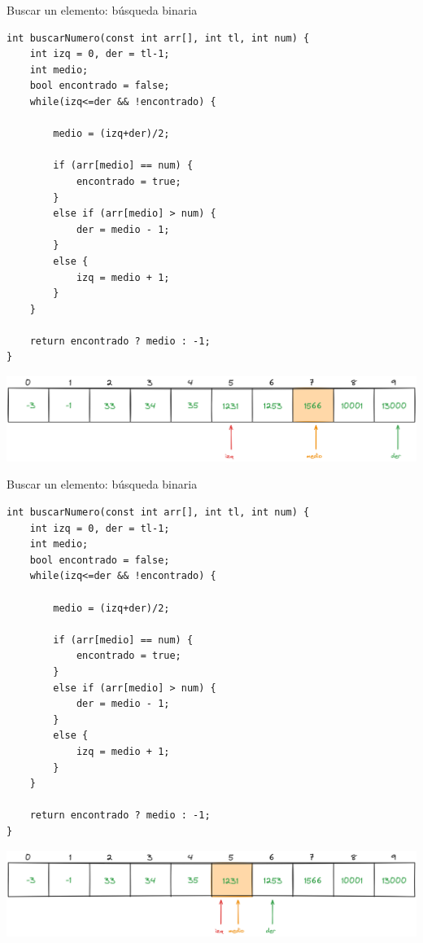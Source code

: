 \documentclass[12pt]{beamer}
\begin{document}
\begin{frame}[fragile]{Buscar un elemento: búsqueda binaria}
\begin{lstlisting}[basicstyle=\tiny]
int buscarNumero(const int arr[], int tl, int num) {
    int izq = 0, der = tl-1;
    int medio;
    bool encontrado = false;
    while(izq<=der && !encontrado) {
        
        medio = (izq+der)/2;
        
        if (arr[medio] == num) {
            encontrado = true;
        }
        else if (arr[medio] > num) {
            der = medio - 1;
        }
        else {
            izq = medio + 1;
        }
    }
    
    return encontrado ? medio : -1;
}
\end{lstlisting}
    \includegraphics[width=\textwidth]{busqueda_binaria_2.png}
\end{frame}

\begin{frame}[fragile]{Buscar un elemento: búsqueda binaria}
\begin{lstlisting}[basicstyle=\tiny]
int buscarNumero(const int arr[], int tl, int num) {
    int izq = 0, der = tl-1;
    int medio;
    bool encontrado = false;
    while(izq<=der && !encontrado) {
        
        medio = (izq+der)/2;
        
        if (arr[medio] == num) {
            encontrado = true;
        }
        else if (arr[medio] > num) {
            der = medio - 1;
        }
        else {
            izq = medio + 1;
        }
    }
    
    return encontrado ? medio : -1;
}
\end{lstlisting}
    \includegraphics[width=\textwidth]{busqueda_binaria_3.png}
\end{frame}
\end{document}
